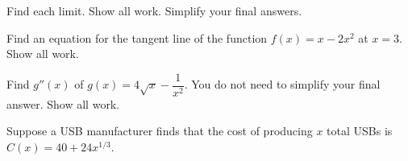 \documentclass[addpoints,12pt]{exam}
\begin{document}
\begin{questions}

\newpage




Find each limit. Show all work. Simplify your final answers.


\newpage

\question[11] Find an equation for the tangent line of the function $f(x)=x-2x^2$ at $x=3$. Show
all work.

\newpage

\question[8] Find $g''(x)$ of $g(x)=4\sqrt{x}-\dfrac{1}{x^2}$. You do not need to simplify your final
answer. Show all work.


\newpage




\question Suppose a USB manufacturer finds that the cost of producing $x$ total USBs is
$C(x)=40+24x^{1/3}$.
\end{questions}
\end{document}
